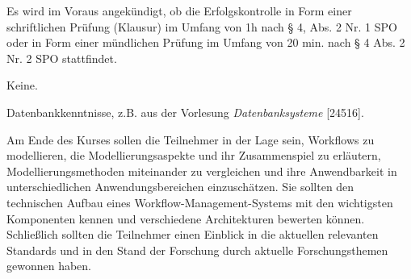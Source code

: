\begin{course}

\setdoclanguagegerman
{}



\coursehead


\label{cour_10171.dp_997}


\begin{styleenv}
\begin{assessment}
Es wird im Voraus angekündigt, ob die Erfolgskontrolle in Form einer schriftlichen Prüfung (Klausur) im Umfang von 1h nach § 4, Abs. 2 Nr. 1 SPO oder in Form einer mündlichen Prüfung im Umfang von 20 min. nach § 4 Abs. 2 Nr. 2 SPO stattfindet.


\end{assessment}

\begin{conditions}Keine.\end{conditions}

\begin{recommendations}Datenbankkenntnisse, z.B. aus der Vorlesung \emph{Datenbanksysteme} [24516].

\end{recommendations}
\end{styleenv}

\begin{learningoutcomes}
Am Ende des Kurses sollen die Teilnehmer in der Lage sein, Workflows zu modellieren, die Modellierungsaspekte und ihr Zusammenspiel zu erläutern, Modellierungsmethoden miteinander zu vergleichen und ihre Anwendbarkeit in unterschiedlichen Anwendungsbereichen einzuschätzen. Sie sollten den technischen Aufbau eines Workflow-Management-Systems mit den wichtigsten Komponenten kennen und verschiedene Architekturen bewerten können. Schließlich sollten die Teilnehmer einen Einblick in die aktuellen relevanten Standards und in den Stand der Forschung durch aktuelle Forschungsthemen gewonnen haben.



\end{learningoutcomes}
\end{course}
